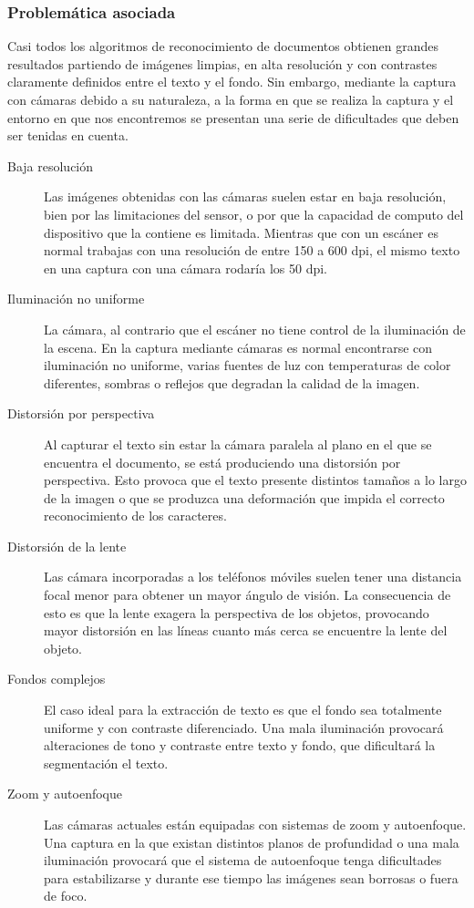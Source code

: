 \subsubsection{Problemática asociada}
Casi todos los algoritmos de reconocimiento de documentos obtienen grandes resultados partiendo de imágenes limpias, en alta resolución y con contrastes claramente definidos entre el texto y el fondo. Sin embargo, mediante la captura con cámaras debido a su naturaleza, a la forma en que se realiza la captura y el entorno en que nos encontremos se presentan una serie de dificultades que deben ser tenidas en cuenta.  
\begin{description}
\item[Baja resolución] Las imágenes obtenidas con las cámaras suelen estar en baja resolución, bien por las limitaciones del sensor, o por que la capacidad de computo del dispositivo que la contiene es limitada. Mientras que con un escáner es normal trabajas con una resolución de entre 150 a 600 dpi, el mismo texto en una captura con una cámara rodaría los 50 dpi.
\item[Iluminación no uniforme] La cámara, al contrario que el escáner no tiene control de la iluminación de la escena. En la captura mediante cámaras es normal encontrarse con iluminación no uniforme, varias fuentes de luz con temperaturas de color diferentes, sombras o reflejos que degradan la calidad de la imagen.
\item[Distorsión por perspectiva] Al capturar el texto sin estar la cámara paralela al plano en el que se encuentra el documento, se está produciendo una distorsión por perspectiva. Esto provoca que el texto presente distintos tamaños a lo largo de la imagen o que se produzca una deformación que impida el correcto reconocimiento de los caracteres. 
\item[Distorsión de la lente] Las cámara incorporadas a los teléfonos móviles suelen tener una distancia focal menor para obtener un mayor ángulo de visión. La consecuencia de esto es que la lente exagera la perspectiva de los objetos, provocando mayor distorsión en las líneas cuanto más cerca se encuentre la lente del objeto.
\item[Fondos complejos] El caso ideal para la extracción de texto es que el fondo sea totalmente uniforme y con contraste diferenciado. Una mala iluminación provocará alteraciones de tono y contraste entre texto y fondo, que dificultará la segmentación el texto. 
\item[Zoom y autoenfoque] Las cámaras actuales están equipadas con sistemas de zoom y autoenfoque. Una captura en la que existan distintos planos de profundidad o una mala iluminación provocará que el sistema de autoenfoque tenga dificultades para estabilizarse y durante ese tiempo las imágenes sean borrosas o fuera de foco.

\end{description}
